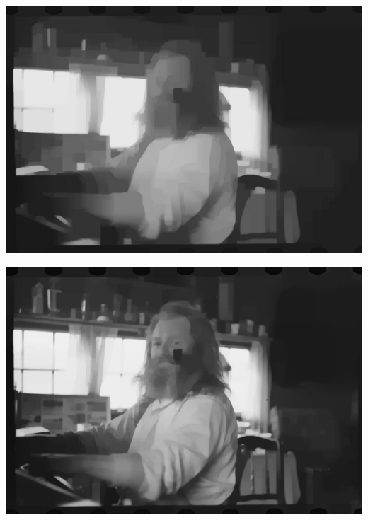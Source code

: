 \begin{frame}

\begin{center}
\includegraphics[width=\textwidth]{img/img1.jpg}
\end{center}

\end{frame}


\begin{frame}

\begin{center}
\includegraphics[width=\textwidth]{img/img2.jpg}
\end{center}

\end{frame}


